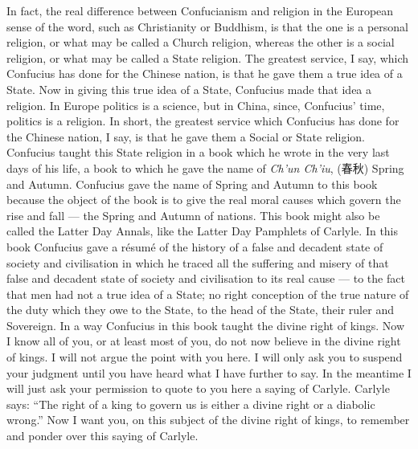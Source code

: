 In fact, the real difference between Confucianism and religion in the European sense of the word, such as Christianity or Buddhism, is that the one is a personal religion, or what may be called a Church religion, whereas the other is a social religion, or what may be called a State religion.
The greatest service, I say, which Confucius has done for the Chinese nation, is that he gave them a true idea of a State.
Now in giving this true idea of a State, Confucius made that idea a religion.
In Europe politics is a science, but in China, since, Confucius' time, politics is a religion.
In short, the greatest service which Confucius has done for the Chinese nation, I say, is that he gave them a Social or State religion.
Confucius taught this State religion in a book which he wrote in the very last days of his life, a book to which he gave the name of \emph{Ch'un Ch'iu}, (春秋) Spring and Autumn.
Confucius gave the name of Spring and Autumn to this book because the object of the book is to give the real moral causes which govern the rise and fall --- the Spring and Autumn of nations.
This book might also be called the Latter Day Annals, like the Latter Day Pamphlets of Carlyle. 
In this book Confucius gave a r\'esum\'e of the history of a false and decadent state of society and civilisation in which he traced all the suffering and misery of that false and decadent state of society and civilisation to its real cause --- to the fact that men had not a true idea of a State; no right conception of the true nature of the duty which they owe to the State, to the head of the State, their ruler and Sovereign.
In a way Confucius in this book taught the divine right of kings.
Now I know all of you, or at least most of you, do not now believe in the divine right of kings.
I will not argue the point with you here.
I will only ask you to suspend your judgment  until you have heard what I have further to say.
In the meantime I will just ask your permission to quote to you here a saying of Carlyle.
Carlyle says: ``The right of a king to govern us is either a divine right or a diabolic wrong.''
Now I want you, on this subject of the divine right of kings, to remember and ponder over this saying of Carlyle.

